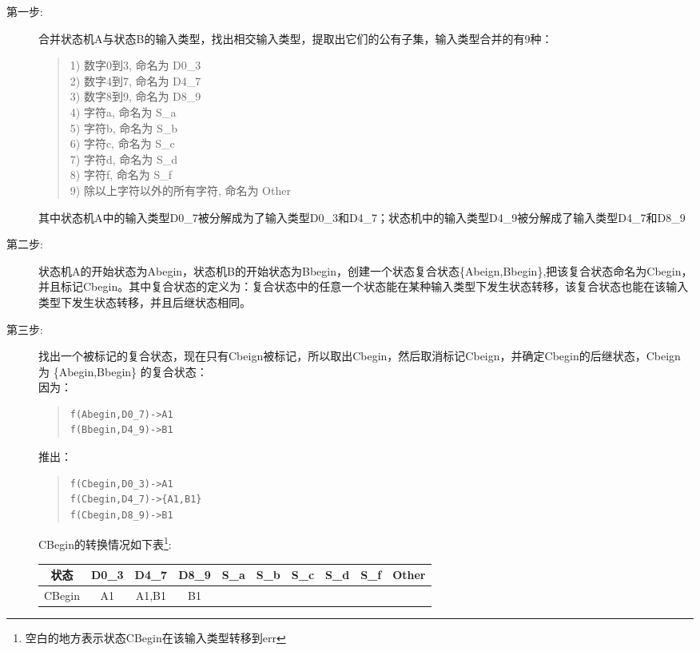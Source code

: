 \begin{description}
\item[第一步:]合并状态机A与状态B的输入类型，找出相交输入类型，提取出它们的公有子集，输入类型合并的有9种：
\begin{quote}
1) 数字0到3, 命名为 D0\_3 \\
2) 数字4到7, 命名为 D4\_7 \\
3) 数字8到9, 命名为 D8\_9 \\
4) 字符a,  命名为 S\_a \\
5) 字符b,  命名为 S\_b \\
6) 字符c,  命名为 S\_c \\
7) 字符d,  命名为 S\_d \\
8) 字符f,  命名为 S\_f \\
9) 除以上字符以外的所有字符, 命名为 Other
\end{quote}
其中状态机A中的输入类型D0\_7被分解成为了输入类型D0\_3和D4\_7；状态机中的输入类型D4\_9被分解成了输入类型D4\_7和D8\_9
\item[第二步:]状态机A的开始状态为Abegin，状态机B的开始状态为Bbegin，创建一个状态复合状态\{Abeign,Bbegin\},把该复合状态命名为Cbegin，并且标记Cbegin。其中复合状态的定义为：复合状态中的任意一个状态能在某种输入类型下发生状态转移，该复合状态也能在该输入类型下发生状态转移，并且后继状态相同。
\item[第三步:]找出一个被标记的复合状态，现在只有Cbeign被标记，所以取出Cbegin，然后取消标记Cbeign，并确定Cbegin的后继状态，Cbeign 为 \{Abegin,Bbegin\} 的复合状态：\\
因为：
\begin{quote}
\begin{verbatim}
f(Abegin,D0_7)->A1
f(Bbegin,D4_9)->B1
\end{verbatim}
\end{quote}
推出：
\begin{quote}
\begin{verbatim}
f(Cbegin,D0_3)->A1
f(Cbegin,D4_7)->{A1,B1}
f(Cbegin,D8_9)->B1
\end{verbatim}
\end{quote}
CBegin的转换情况如下表\footnote{空白的地方表示状态CBegin在该输入类型转移到err}:

\begin{tabular}[c]{c|c|c|c|c|c|c|c|c|c}
状态&	D0\_3&D4\_7&D8\_9&S\_a&S\_b&S\_c&S\_d&S\_f&Other \\
\hline
CBegin&A1&A1,B1&B1&&&&&&\\
\hline
\end{tabular}


\end{description}
